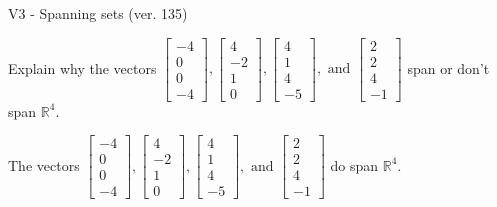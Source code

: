 \begin{exercise}
  \begin{exerciseTitle}V3 - Spanning sets (ver. 135)\end{exerciseTitle}
  \begin{exerciseStatement}
    Explain why the vectors \(\left[\begin{array}{r}
-4 \\
0 \\
0 \\
-4
\end{array}\right] , \left[\begin{array}{r}
4 \\
-2 \\
1 \\
0
\end{array}\right] , \left[\begin{array}{r}
4 \\
1 \\
4 \\
-5
\end{array}\right] , \text{ and } \left[\begin{array}{r}
2 \\
2 \\
4 \\
-1
\end{array}\right]\) span or don't span \(\mathbb{R}^4\). 
	


  \end{exerciseStatement}
  \begin{exerciseAnswer}
   The vectors \(\left[\begin{array}{r}
-4 \\
0 \\
0 \\
-4
\end{array}\right] , \left[\begin{array}{r}
4 \\
-2 \\
1 \\
0
\end{array}\right] , \left[\begin{array}{r}
4 \\
1 \\
4 \\
-5
\end{array}\right] , \text{ and } \left[\begin{array}{r}
2 \\
2 \\
4 \\
-1
\end{array}\right]\) 
  	 do  
	span \(\mathbb{R}^4\).
  


  \end{exerciseAnswer}
\end{exercise}